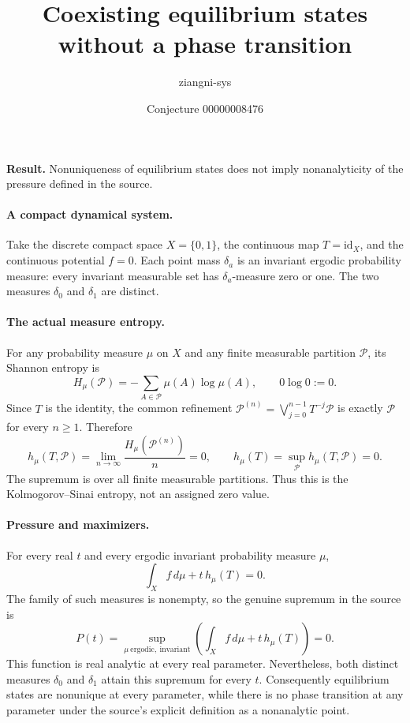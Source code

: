 \documentclass[11pt]{article}
\title{Coexisting equilibrium states without a phase transition}
\author{ziangni-sys}
\date{Conjecture 00000008476}
\begin{document}
\raggedright
\maketitle
\noindent\textbf{Result.} Nonuniqueness of equilibrium states does not imply nonanalyticity of the pressure defined in the source.

\paragraph{A compact dynamical system.}
Take the discrete compact space $X=\{0,1\}$, the continuous map $T=\mathrm{id}_X$, and the continuous potential $f=0$. Each point mass $\delta_a$ is an invariant ergodic probability measure: every invariant measurable set has $\delta_a$-measure zero or one. The two measures $\delta_0$ and $\delta_1$ are distinct.

\paragraph{The actual measure entropy.}
For any probability measure $\mu$ on $X$ and any finite measurable partition $\mathcal P$, its Shannon entropy is
\[
 H_\mu(\mathcal P)=-\sum_{A\in\mathcal P}\mu(A)\log\mu(A),
 \qquad 0\log0:=0.
\]
Since $T$ is the identity, the common refinement
$\mathcal P^{(n)}=\bigvee_{j=0}^{n-1}T^{-j}\mathcal P$
is exactly $\mathcal P$ for every $n\ge1$. Therefore
\[
 h_\mu(T,\mathcal P)
 =\lim_{n\to\infty}\frac{H_\mu(\mathcal P^{(n)})}{n}=0,
 \qquad
 h_\mu(T)=\sup_{\mathcal P}h_\mu(T,\mathcal P)=0.
\]
The supremum is over all finite measurable partitions. Thus this is the Kolmogorov--Sinai entropy, not an assigned zero value.

\paragraph{Pressure and maximizers.}
For every real $t$ and every ergodic invariant probability measure $\mu$,
\[
 \int_X f\,d\mu+t\,h_\mu(T)=0.
\]
The family of such measures is nonempty, so the genuine supremum in the source is
\[
 P(t)=\sup_{\mu\ \mathrm{ergodic,\ invariant}}
 \left(\int_X f\,d\mu+t\,h_\mu(T)\right)=0.
\]
This function is real analytic at every real parameter. Nevertheless, both distinct measures $\delta_0$ and $\delta_1$ attain this supremum for every $t$. Consequently equilibrium states are nonunique at every parameter, while there is no phase transition at any parameter under the source's explicit definition as a nonanalytic point.
\end{document}
